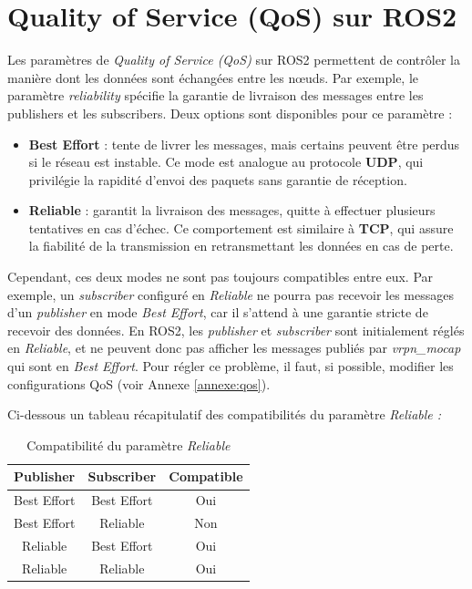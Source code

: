 \section{Quality of Service (QoS) sur ROS2}

Les paramètres de \textit{Quality of Service (QoS)} sur ROS2 permettent de contrôler la manière dont les données sont échangées entre les nœuds.
Par exemple, le paramètre \textit{reliability} spécifie la garantie de livraison des messages entre les publishers et les subscribers. Deux options sont disponibles pour ce paramètre :

\begin{itemize}
    \item \textbf{Best Effort} : tente de livrer les messages, mais certains peuvent être perdus si le réseau est instable. Ce mode est analogue au protocole \textbf{UDP}, qui privilégie la rapidité d'envoi des paquets sans garantie de réception. 
    \item \textbf{Reliable} : garantit la livraison des messages, quitte à effectuer plusieurs tentatives en cas d’échec. Ce comportement est similaire à \textbf{TCP}, qui assure la fiabilité de la transmission en retransmettant les données en cas de perte.
\end{itemize}


\noindent Cependant, ces deux modes ne sont pas toujours compatibles entre eux. Par exemple, un \textit{subscriber} configuré en \textit{Reliable} ne pourra pas recevoir les messages d’un \textit{publisher} en mode \textit{Best Effort}, car il s’attend à une garantie stricte de recevoir des données. En ROS2, les \textit{publisher} et \textit{subscriber} sont initialement réglés en \textit{Reliable}, et ne peuvent donc pas afficher les messages publiés par \textit{vrpn\_mocap} qui sont en \textit{Best Effort}. Pour régler ce problème, il faut, si possible, modifier les configurations QoS (voir Annexe \ref{annexe:qos}). 

\noindent Ci-dessous un tableau récapitulatif des compatibilités du paramètre \textit{Reliable :}
\begin{table}[h]
    \centering
    \begin{tabular}{|c|c|c|}
        \hline
        \textbf{Publisher} & \textbf{Subscriber} & \textbf{Compatible} \\
        \hline
        Best Effort & Best Effort & Oui \\
        Best Effort & Reliable & Non \\
        Reliable & Best Effort & Oui \\
        Reliable & Reliable & Oui \\
        \hline
    \end{tabular}
    \caption{Compatibilité du paramètre \textit{Reliable }}
    \label{tab:qos_compatibility}
\end{table}

